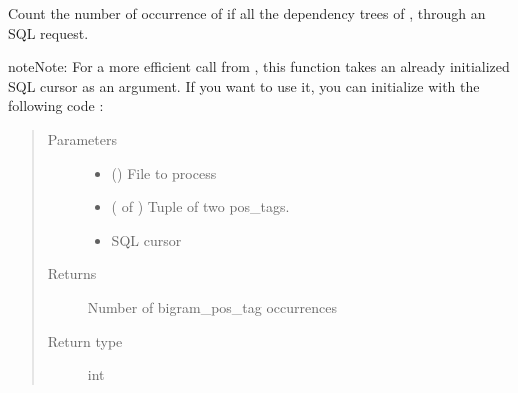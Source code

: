\documentclass[letterpaper,10pt,english]{sphinxmanual}
\begin{document}

\begin{fulllineitems}
\label{\detokenize{analysis:loacore.analysis.frequencies.count_bigram_pos_tag}}
Count the number of occurrence of  if all the dependency trees of , through an SQL request.

\begin{sphinxadmonition}{note}{Note:}
For a more efficient call from {\hyperref[\detokenize{analysis:loacore.analysis.frequencies.bigram_pos_tag_frequencies}]{}}, this function takes an already initialized SQL
cursor as an argument.
If you want to use it, you can initialize  with the following code :

%
\begin{sphinxVerbatim}[commandchars=\\\{\}]
   
   
  
  
\end{sphinxVerbatim}
\end{sphinxadmonition}
\begin{quote}\begin{description}
\item[{Parameters}] \leavevmode\begin{itemize}
\item {} 
 ({\hyperref[\detokenize{classes:loacore.classes.classes.File}]{}}) \textendash{} File to process

\item {} 
 ( of ) \textendash{} Tuple of two pos\_tags.

\item {} 
 \textendash{} SQL cursor

\end{itemize}

\item[{Returns}] \leavevmode
Number of bigram\_pos\_tag occurrences

\item[{Return type}] \leavevmode
int

\end{description}\end{quote}

\end{fulllineitems}
\end{document}
